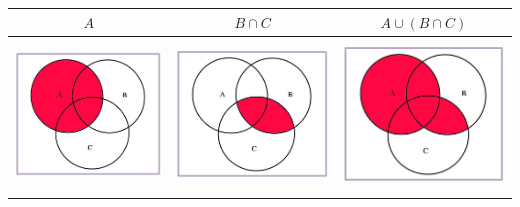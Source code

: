 \documentclass[]{book}
\begin{document}
\begin{longtable}[]{@{}ccc@{}}
\toprule
\(A\) & \(B\cap C\) & \(A\cup (B\cap C)\)\tabularnewline
\midrule
\endhead
\includegraphics[width=\textwidth,height=4cm]{Images/proba1dibujos/distr11.jpg} & \includegraphics[width=\textwidth,height=4cm]{Images/proba1dibujos/distr12.jpg} & \includegraphics[width=\textwidth,height=4cm]{Images/proba1dibujos/distr13.jpg}\tabularnewline
\bottomrule
\end{longtable}
\end{document}
